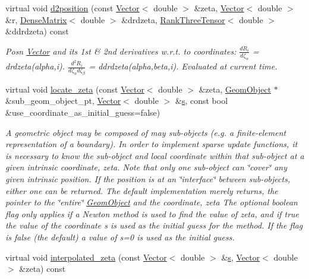 \begin{DoxyCompactItemize}
virtual void \hyperlink{classoomph_1_1GeomObject_a4fdbd372e26d4486026c06dcfdaafe81}{d2position} (const \hyperlink{classoomph_1_1Vector}{Vector}$<$ double $>$ \&zeta, \hyperlink{classoomph_1_1Vector}{Vector}$<$ double $>$ \&r, \hyperlink{classoomph_1_1DenseMatrix}{Dense\+Matrix}$<$ double $>$ \&drdzeta, \hyperlink{classoomph_1_1RankThreeTensor}{Rank\+Three\+Tensor}$<$ double $>$ \&ddrdzeta) const
\begin{DoxyCompactList}\small\item\em Posn \hyperlink{classoomph_1_1Vector}{Vector} and its 1st \& 2nd derivatives w.\+r.\+t. to coordinates\+: $ \frac{dR_i}{d \zeta_\alpha}$ = drdzeta(alpha,i). $ \frac{d^2R_i}{d \zeta_\alpha d \zeta_\beta}$ = ddrdzeta(alpha,beta,i). Evaluated at current time. \end{DoxyCompactList}\item 
virtual void \hyperlink{classoomph_1_1GeomObject_a78ee9f98bcfd0c5e1f07a459777663d3}{locate\+\_\+zeta} (const \hyperlink{classoomph_1_1Vector}{Vector}$<$ double $>$ \&zeta, \hyperlink{classoomph_1_1GeomObject}{Geom\+Object} $\ast$\&sub\+\_\+geom\+\_\+object\+\_\+pt, \hyperlink{classoomph_1_1Vector}{Vector}$<$ double $>$ \&\hyperlink{cfortran_8h_ab7123126e4885ef647dd9c6e3807a21c}{s}, const bool \&use\+\_\+coordinate\+\_\+as\+\_\+initial\+\_\+guess=false)
\begin{DoxyCompactList}\small\item\em A geometric object may be composed of may sub-\/objects (e.\+g. a finite-\/element representation of a boundary). In order to implement sparse update functions, it is necessary to know the sub-\/object and local coordinate within that sub-\/object at a given intrinsic coordinate, zeta. Note that only one sub-\/object can \char`\"{}cover\char`\"{} any given intrinsic position. If the position is at an \char`\"{}interface\char`\"{} between sub-\/objects, either one can be returned. The default implementation merely returns, the pointer to the \char`\"{}entire\char`\"{} \hyperlink{classoomph_1_1GeomObject}{Geom\+Object} and the coordinate, zeta The optional boolean flag only applies if a Newton method is used to find the value of zeta, and if true the value of the coordinate s is used as the initial guess for the method. If the flag is false (the default) a value of s=0 is used as the initial guess. \end{DoxyCompactList}\item 
virtual void \hyperlink{classoomph_1_1GeomObject_a1c5530baea63e377937920d2dcf0d583}{interpolated\+\_\+zeta} (const \hyperlink{classoomph_1_1Vector}{Vector}$<$ double $>$ \&\hyperlink{cfortran_8h_ab7123126e4885ef647dd9c6e3807a21c}{s}, \hyperlink{classoomph_1_1Vector}{Vector}$<$ double $>$ \&zeta) const

\end{DoxyCompactItemize}
